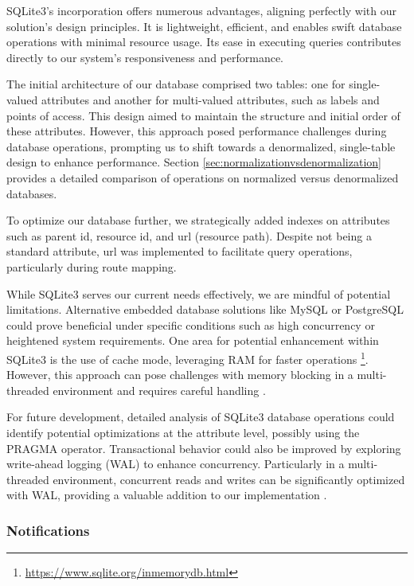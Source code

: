 \documentclass[a4paper,fleqn]{cas-dc}
\begin{document}
SQLite3's incorporation offers numerous advantages, aligning perfectly with our solution's design principles. It is lightweight, efficient, and enables swift database operations with minimal resource usage. Its ease in executing queries contributes directly to our system's responsiveness and performance.

The initial architecture of our database comprised two tables: one for single-valued attributes and another for multi-valued attributes, such as labels and points of access. This design aimed to maintain the structure and initial order of these attributes. However, this approach posed performance challenges during database operations, prompting us to shift towards a denormalized, single-table design to enhance performance. Section \ref{sec:normalizationvsdenormalization} provides a detailed comparison of operations on normalized versus denormalized databases.

To optimize our database further, we strategically added indexes on attributes such as parent id, resource id, and url (resource path). Despite not being a standard attribute, url was implemented to facilitate query operations, particularly during route mapping.

While SQLite3 serves our current needs effectively, we are mindful of potential limitations. Alternative embedded database solutions like MySQL or PostgreSQL could prove beneficial under specific conditions such as high concurrency or heightened system requirements. One area for potential enhancement within SQLite3 is the use of cache mode, leveraging RAM for faster operations \footnote{\url{https://www.sqlite.org/inmemorydb.html}}. However, this approach can pose challenges with memory blocking in a multi-threaded environment and requires careful handling \cite{}.

For future development, detailed analysis of SQLite3 database operations could identify potential optimizations at the attribute level, possibly using the PRAGMA operator. Transactional behavior could also be improved by exploring write-ahead logging (WAL) to enhance concurrency. Particularly in a multi-threaded environment, concurrent reads and writes can be significantly optimized with WAL, providing a valuable addition to our implementation \cite{}.

\subsubsection{Notifications}
\end{document}

